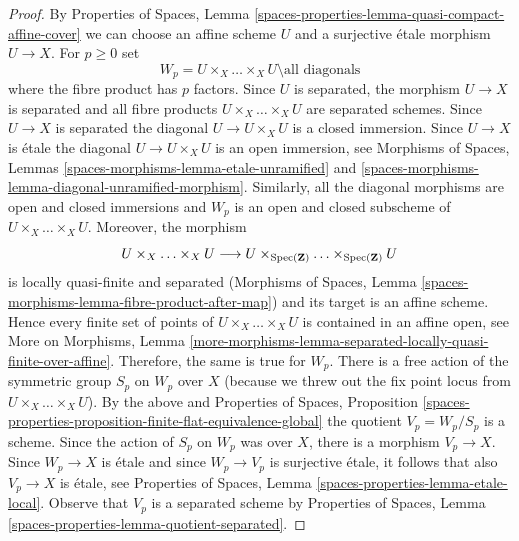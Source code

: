 \begin{proof}
By Properties of Spaces, Lemma
\ref{spaces-properties-lemma-quasi-compact-affine-cover}
we can choose an affine scheme $U$ and a surjective \'etale morphism
$U \to X$. For $p \geq 0$ set
$$
W_p = U \times_X \ldots \times_X U \setminus \text{all diagonals}
$$
where the fibre product has $p$ factors. Since $U$ is separated,
the morphism $U \to X$ is separated and all fibre products
$U \times_X \ldots \times_X U$ are separated schemes. Since $U \to X$ is
separated the diagonal $U \to U \times_X U$ is a closed immersion. Since
$U \to X$ is \'etale the diagonal $U \to U \times_X U$ is an open
immersion, see Morphisms of Spaces, Lemmas
\ref{spaces-morphisms-lemma-etale-unramified} and
\ref{spaces-morphisms-lemma-diagonal-unramified-morphism}.
Similarly, all the diagonal morphisms are open and closed immersions and
$W_p$ is an open and closed subscheme of $U \times_X \ldots \times_X U$.
Moreover, the morphism
$$
U \times_X \ldots \times_X U \longrightarrow
U \times_{\operatorname{Spec}(\mathbf{Z})} \ldots \times_{\operatorname{Spec}(\mathbf{Z})} U
$$
is locally quasi-finite and separated (Morphisms of Spaces,
Lemma \ref{spaces-morphisms-lemma-fibre-product-after-map})
and its target is an affine scheme. Hence every finite set of points of
$U \times_X \ldots \times_X U$ is contained in an affine open, see
More on Morphisms, Lemma
\ref{more-morphisms-lemma-separated-locally-quasi-finite-over-affine}.
Therefore, the same is true for $W_p$.
There is a free action of the symmetric group $S_p$ on $W_p$ over $X$
(because we threw out the fix point locus from
$U \times_X \ldots \times_X U$). By the above and
Properties of Spaces, Proposition
\ref{spaces-properties-proposition-finite-flat-equivalence-global}
the quotient $V_p = W_p/S_p$ is a scheme. Since the action of
$S_p$ on $W_p$ was over $X$, there is a morphism $V_p \to X$.
Since $W_p \to X$ is \'etale and since $W_p \to V_p$ is surjective
\'etale, it follows that also $V_p \to X$ is \'etale, see
Properties of Spaces, Lemma \ref{spaces-properties-lemma-etale-local}.
Observe that $V_p$ is a separated scheme by
Properties of Spaces, Lemma
\ref{spaces-properties-lemma-quotient-separated}.


\end{proof}
